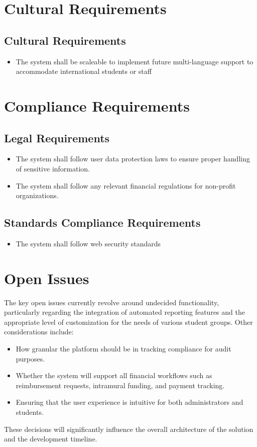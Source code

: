 \documentclass[12pt]{article}
\begin{document}
\section{Cultural Requirements}
\subsection{Cultural Requirements}
\begin{itemize}
    \item The system shall be scaleable to implement future multi-language support to accommodate international students or staff 
\end{itemize}

\section{Compliance Requirements}
\subsection{Legal Requirements}
\begin{itemize}
    \item The system shall follow user data protection laws to ensure proper handling of sensitive information.
    \item The system shall follow any relevant financial regulations for non-profit organizations.
\end{itemize}
\subsection{Standards Compliance Requirements}
\begin{itemize}
    \item The system shall follow web security standards
\end{itemize}

\section{Open Issues}
The key open issues currently revolve around undecided functionality, particularly regarding the integration of automated reporting features and the appropriate level of customization for the needs of various student groups. Other considerations include:
\begin{itemize}
    \item How granular the platform should be in tracking compliance for audit purposes.
    \item Whether the system will support all financial workflows such as reimbursement requests, intramural funding, and payment tracking.
    \item Ensuring that the user experience is intuitive for both administrators and students.
\end{itemize}
These decisions will significantly influence the overall architecture of the solution and the development timeline.
\end{document}
